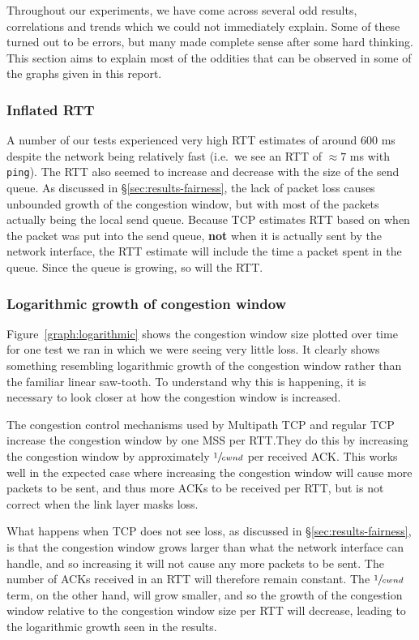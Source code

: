 Throughout our experiments, we have come across several odd results,
correlations and trends which we could not immediately explain. Some of these
turned out to be errors, but many made complete sense after some hard
thinking. This section aims to explain most of the oddities that can be observed
in some of the graphs given in this report.

\subsubsection{Inflated RTT}
A number of our tests experienced very high RTT estimates of around 600 ms despite the network
being relatively fast (i.e.\ we see an RTT of $\approx 7$ ms with \texttt{ping}).
The RTT also seemed to increase and decrease with the size of the send queue. As 
discussed in \S\ref{sec:results-fairness}, the lack of packet loss causes 
unbounded growth of the congestion window, but with most of the packets actually being
the local send queue. Because TCP estimates RTT based on when the packet was put into 
the send queue, \textbf{not} when it is actually sent by the network interface, 
the RTT estimate will include the time a packet spent in the queue. Since the 
queue is growing, so will the RTT.

\subsubsection{Logarithmic growth of congestion window}
Figure~\ref{graph:logarithmic} shows the congestion window size plotted over
time for one test we ran in which we were seeing very little loss. It clearly
shows something resembling logarithmic growth of the congestion window rather than the familiar linear
saw-tooth. To understand why this is happening, it is necessary to look closer
at how the congestion window is increased.

The congestion control mechanisms used by Multipath TCP and regular TCP
increase the congestion window by one MSS per RTT.\@ They do this by increasing
the congestion window by approximately $\sfrac{1}{cwnd}$ per received ACK.\@
This works well in the expected case where increasing the congestion window will
cause more packets to be sent, and thus more ACKs to be received per RTT, but is not
correct when the link layer masks loss.

What happens when TCP does not see loss, as discussed in \S\ref{sec:results-fairness}, 
is that the congestion window grows larger than what the network 
interface can handle, and so increasing it will not cause any more packets to be 
sent. The number of ACKs received in an RTT will therefore remain constant. The 
$\sfrac{1}{cwnd}$ term, on the other hand, will grow smaller, and so the growth of the 
congestion window relative to the congestion window size per RTT will decrease, 
leading to the logarithmic growth seen in the results.

